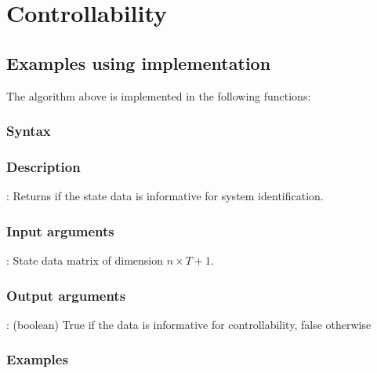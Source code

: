 \section{Controllability}










\subsection{Examples using implementation}
The algorithm above is implemented in the following functions:
\subsubsection*{Syntax}

\subsubsection*{Description}
: Returns if the state data is informative for system identification.

\subsubsection*{Input arguments}
\textbf{}: State data matrix of dimension $n \times T+1$.

\subsubsection*{Output arguments}
\textbf{}: (boolean) True if the data is informative for controllability, false otherwise

\subsubsection*{Examples}